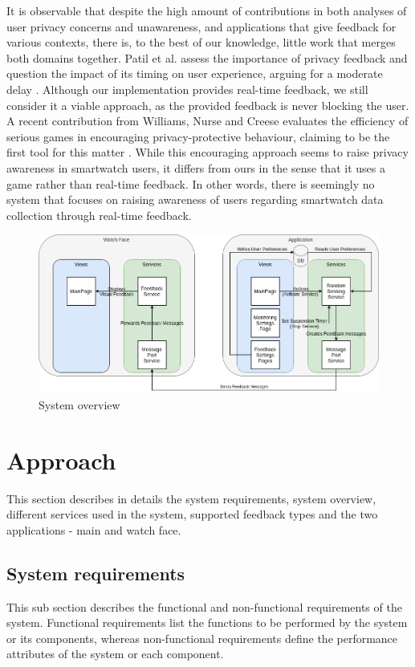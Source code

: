 \documentclass[conference, a4paper, 10pt, twocolumn]{IEEEtran}
\begin{document}
It is observable that despite the high amount of contributions in both analyses of user privacy concerns and unawareness, and applications that give feedback for various contexts, there is, to the best of our knowledge, little work that merges both domains together. Patil et al. assess the importance of privacy feedback and question the impact of its timing on user experience, arguing for a moderate delay \cite{patil2015interrupt}. Although our implementation provides real-time feedback, we still consider it a viable approach, as the provided feedback is never blocking the user. A recent contribution from Williams, Nurse and Creese evaluates the efficiency of serious games in encouraging privacy-protective behaviour, claiming to be the first tool for this matter \cite{williams2019smart}. While this encouraging approach seems to raise privacy awareness in smartwatch users, it differs from ours in the sense that it uses a game rather than real-time feedback. In other words, there is seemingly no system that focuses on raising awareness of users regarding smartwatch data collection through real-time feedback.  

\begin{figure}[ht]
\centerline{\includegraphics[width=.9\textwidth]{img/appDiagram.png}}
\caption{System overview}
\label{fig:systemOverview}
\end{figure}

\section{\textbf{Approach}}\label{approach}
This section describes in details the system requirements, system overview, different services used in the system, supported feedback types and the two applications - main and watch face. 

\subsection{\textbf{System requirements}}
This sub section describes the functional and non-functional requirements of the system. Functional requirements list the functions to be performed by the system or its components, whereas non-functional requirements define the performance attributes of the system or each component.
\end{document}
